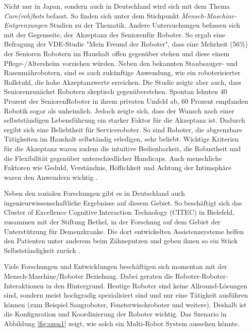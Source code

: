 Nicht nur in Japan, sondern auch in Deutschland wird sich mit dem Thema \textit{Care(rob)bots} befasst. So finden sich unter dem Stichpunkt \textit{Mensch-Maschine-Entgrenzungen} Studien zu der Thematik. Andere Untersuchungen befassen sich mit der Gegenseite, der Akzeptanz der Senioren\FemaleMale für Roboter. So ergab eine Befragung der VDE-Studie "Mein Freund der Roboter", dass eine Mehrheit (56\%) der Senioren Robotern im Haushalt offen gegenüber stehen und diese einem Pflege-/Altersheim vorziehen würden. Neben den bekannten Staubsauger- und Rasenmährobotern, sind es auch zukünftige Anwendung, wie ein roboterisierter Rollstuhl, die hohe Akzeptanzwerte erreichen. Die Studie zeigte aber auch, dass Senioren\FemaleMale zunächst Robotern skeptisch gegenüberstehen. Spontan lehnten 40 Prozent der Senioren\FemaleMale Roboter in ihrem privaten Umfeld ab, 60 Prozent empfanden Robotik sogar als unheimlich. Jedoch zeigte sich, dass der Wunsch nach einer selbstständigen Lebensführung ein starker Faktor für die Akzeptanz ist. Dadurch ergibt sich eine Beliebtheit für Serviceroboter. So sind Roboter, die abgrenzbare Tätigkeiten im Haushalt selbständig erledigen, sehr beliebt. Wichtige Kriterien für die Akzeptanz waren zudem die intuitive Bedienbarkeit, die Robustheit und die Flexibilität gegenüber unterschiedlicher Handicaps. Auch menschliche Faktoren wie Geduld, Verständnis, Höflichkeit und Achtung der Intimsphäre waren den Anwendern wichtig \citep{dr.sibyllemeyer2011}.

Neben den sozialen Forschungen gibt es in Deutschland auch ingenieurwissenschaftliche Ergebnisse auf diesem Gebiet. So beschäftigt sich das Cluster of Excellence Cognitive Interaction Technology (CITEC) in Bielefeld, zusammen mit der Stiftung Bethel, in der Forschung auf dem Gebiet der Unterstützung für Demenzkranke. Die dort entwickelten Assistenzsysteme helfen den Patienten unter anderem beim Zähneputzen und geben ihnen so ein Stück Selbstständigkeit zurück \citep{peters2010task}. 

Viele Forschungen und Entwicklungen beschäftigen sich momentan mit der Mensch-Maschine/Roboter Beziehung. Dabei geraten die Roboter-Roboter-Interaktionen in den Hintergrund. Heutige Roboter sind keine Allround-Lösungen sind, sondern meist hochgradig spezialisiert sind und nur eine Tätigkeit ausführen können (zum Beispiel Saugroboter, Fensterwischroboter und weitere). Deshalb ist die Konfiguration und Koordinierung der Roboter wichtig. Das Szenario in Abbildung \ref{fig:szen1} zeigt, wie solch ein Multi-Robot System aussehen könnte.


